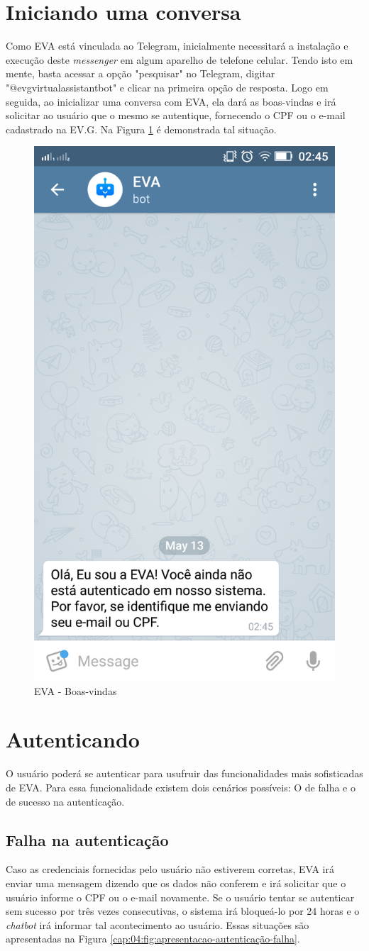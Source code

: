 \section{Iniciando uma conversa}

Como EVA está vinculada ao Telegram, inicialmente necessitará a instalação e execução deste \textit{messenger} em algum aparelho de telefone celular. Tendo isto em mente, basta acessar a opção "pesquisar" no Telegram, digitar "@evgvirtualassistantbot" e clicar na primeira opção de resposta. Logo em seguida, ao inicializar uma conversa com EVA, ela dará as boas-vindas e irá solicitar ao usuário que o mesmo se autentique, fornecendo o CPF ou o e-mail cadastrado na EV.G. Na Figura \ref{cap:04:fig:apresentacao-boas-vindas} é demonstrada tal situação.

\begin{figure}
  \caption{
    \label{cap:04:fig:apresentacao-boas-vindas}
    EVA - Boas-vindas
  }
  \includegraphics[width=0.2\linewidth]{imagens/apresentacao-boas-vindas.png}
  \mfonte
\end{figure}

\section{Autenticando}
O usuário poderá se autenticar para usufruir das funcionalidades mais sofisticadas de EVA. Para essa funcionalidade existem dois cenários possíveis: O de falha e o de sucesso na autenticação.

\subsection{Falha na autenticação}
Caso as credenciais fornecidas pelo usuário não estiverem corretas, EVA irá enviar uma mensagem dizendo que os dados não conferem e irá solicitar que o usuário informe o CPF ou o e-mail novamente. Se o usuário tentar se autenticar sem sucesso por três vezes consecutivas, o sistema irá bloqueá-lo por 24 horas e o \textit{chatbot} irá informar tal acontecimento ao usuário. Essas situações são apresentadas na Figura \ref{cap:04:fig:apresentacao-autenticação-falha}.


